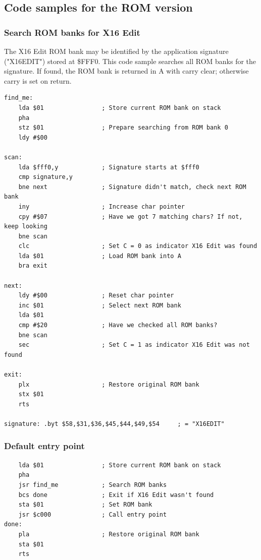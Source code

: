 \documentclass{article}
\begin{document}
    \subsection{Code samples for the ROM version}
    
    \subsubsection{Search ROM banks for X16 Edit}

    The X16 Edit ROM bank may be identified by the
    application signature ("X16EDIT") stored at \$FFF0. This
    code sample searches all ROM banks for the signature.
    If found, the ROM bank is returned in A with carry clear; otherwise
    carry is set on return.

\begin{verbatim}
find_me:
    lda $01                ; Store current ROM bank on stack
    pha
    stz $01                ; Prepare searching from ROM bank 0
    ldy #$00

scan:
    lda $fff0,y            ; Signature starts at $fff0
    cmp signature,y
    bne next               ; Signature didn't match, check next ROM bank
    iny                    ; Increase char pointer
    cpy #$07               ; Have we got 7 matching chars? If not, keep looking
    bne scan
    clc                    ; Set C = 0 as indicator X16 Edit was found
    lda $01                ; Load ROM bank into A
    bra exit

next:
    ldy #$00               ; Reset char pointer
    inc $01                ; Select next ROM bank
    lda $01            
    cmp #$20               ; Have we checked all ROM banks?
    bne scan
    sec                    ; Set C = 1 as indicator X16 Edit was not found

exit:
    plx                    ; Restore original ROM bank
    stx $01
    rts

signature: .byt $58,$31,$36,$45,$44,$49,$54     ; = "X16EDIT"
\end{verbatim}

    \subsubsection{Default entry point}
\begin{verbatim}
    lda $01                ; Store current ROM bank on stack
    pha
    jsr find_me            ; Search ROM banks
    bcs done               ; Exit if X16 Edit wasn't found
    sta $01                ; Set ROM bank
    jsr $c000              ; Call entry point
done:
    pla                    ; Restore original ROM bank
    sta $01
    rts
\end{verbatim}
\end{document}
